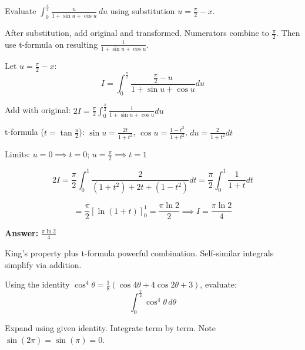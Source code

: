 \vspace{1cm}

\begin{problem}
Evaluate $\int_{0}^{\frac{\pi}{2}} \frac{u}{1 + \sin u + \cos u} \, du$ using substitution $u = \frac{\pi}{2} - x$.
\end{problem}

\begin{hint}
After substitution, add original and transformed. Numerators combine to $\frac{\pi}{2}$. Then use t-formula on resulting $\frac{1}{1+\sin u+\cos u}$.
\end{hint}

\begin{solution}
Let $u = \frac{\pi}{2} - x$:
\[
I = \int_0^{\frac{\pi}{2}} \frac{\frac{\pi}{2}-u}{1+\sin u+\cos u} du
\]

Add with original: $2I = \frac{\pi}{2}\int_0^{\frac{\pi}{2}} \frac{1}{1+\sin u+\cos u} du$

t-formula ($t = \tan\frac{u}{2}$): $\sin u = \frac{2t}{1+t^2}$, $\cos u = \frac{1-t^2}{1+t^2}$, $du = \frac{2}{1+t^2}dt$

Limits: $u=0 \implies t=0$; $u=\frac{\pi}{2} \implies t=1$

\[
2I = \frac{\pi}{2}\int_0^1 \frac{2}{(1+t^2) + 2t + (1-t^2)} dt = \frac{\pi}{2}\int_0^1 \frac{1}{1+t} dt
\]

\[
= \frac{\pi}{2}[\ln(1+t)]_0^1 = \frac{\pi\ln 2}{2} \implies I = \frac{\pi\ln 2}{4}
\]

\textbf{Answer:} $\boxed{\frac{\pi\ln 2}{4}}$
\end{solution}

\begin{takeaways}
King's property plus t-formula powerful combination. Self-similar integrals simplify via addition.
\end{takeaways}

\vspace{1cm}

\begin{problem}
Using the identity $\cos^4\theta = \frac{1}{8}(\cos 4\theta + 4\cos 2\theta + 3)$, evaluate:
\[
\int_0^{\frac{\pi}{2}} \cos^4\theta \, d\theta
\]
\end{problem}

\begin{hint}
Expand using given identity. Integrate term by term. Note $\sin(2\pi) = \sin(\pi) = 0$.
\end{hint}

